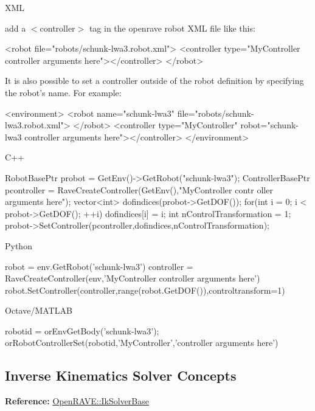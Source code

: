 \begin{DoxyItemize}
\item XML
\begin{DoxyItemize}
\item add a {\bfseries } $<$controller$>$ tag in the openrave robot XML file like this: \begin{DoxyVerb}
<robot file="robots/schunk-lwa3.robot.xml">
  <controller type="MyController controller arguments here"></controller>
</robot>
\end{DoxyVerb}

\item It is also possible to set a controller outside of the robot definition by specifying the robot's name. For example: \begin{DoxyVerb}
<environment>
  <robot name="schunk-lwa3" file="robots/schunk-lwa3.robot.xml">
  </robot>
  <controller type="MyController" robot="schunk-lwa3 controller arguments here"></controller>
  </environment>
\end{DoxyVerb}

\end{DoxyItemize}
\end{DoxyItemize}


\begin{DoxyItemize}
\item C++ 
\begin{DoxyCode}
RobotBasePtr probot = GetEnv()->GetRobot("schunk-lwa3");
ControllerBasePtr pcontroller = RaveCreateController(GetEnv(),"MyController contr
      oller arguments here");
vector<int> dofindices(probot->GetDOF());
for(int i = 0; i < probot->GetDOF(); ++i) {
    dofindices[i] = i;
}
int nControlTransformation = 1;
probot->SetController(pcontroller,dofindices,nControlTransformation);
\end{DoxyCode}

\end{DoxyItemize}


\begin{DoxyItemize}
\item Python 
\begin{DoxyCode}
robot = env.GetRobot('schunk-lwa3')
controller = RaveCreateController(env,'MyController controller arguments here')
robot.SetController(controller,range(robot.GetDOF()),controltransform=1)
\end{DoxyCode}

\end{DoxyItemize}


\begin{DoxyItemize}
\item Octave/MATLAB \begin{DoxyVerb}
robotid = orEnvGetBody('schunk-lwa3');
orRobotControllerSet(robotid,'MyController','controller arguments here')
\end{DoxyVerb}
 
\end{DoxyItemize}\hypertarget{arch_iksolver}{}\subsection{Inverse Kinematics Solver Concepts}\label{arch_iksolver}
{\bfseries Reference:} \hyperlink{classOpenRAVE_1_1IkSolverBase}{OpenRAVE::IkSolverBase}

